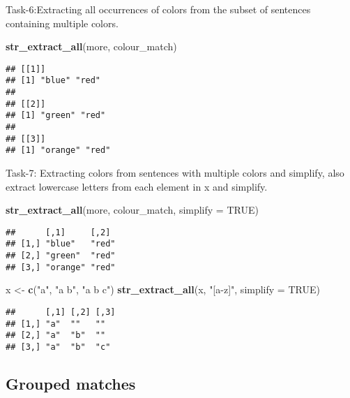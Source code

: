 \documentclass[
]{article}
\newenvironment{Shaded}{\begin{snugshade}}{\end{snugshade}}
\newcommand{\AttributeTok}[1]{\textcolor[rgb]{0.13,0.29,0.53}{#1}}
\newcommand{\ConstantTok}[1]{\textcolor[rgb]{0.56,0.35,0.01}{#1}}
\newcommand{\FunctionTok}[1]{\textcolor[rgb]{0.13,0.29,0.53}{\textbf{#1}}}
\newcommand{\NormalTok}[1]{#1}
\newcommand{\OtherTok}[1]{\textcolor[rgb]{0.56,0.35,0.01}{#1}}
\newcommand{\StringTok}[1]{\textcolor[rgb]{0.31,0.60,0.02}{#1}}
\begin{document}
Task-6:Extracting all occurrences of colors from the subset of sentences
containing multiple colors.

\begin{Shaded}
\begin{Highlighting}[]
\FunctionTok{str\_extract\_all}\NormalTok{(more, colour\_match)}
\end{Highlighting}
\end{Shaded}

\begin{verbatim}
## [[1]]
## [1] "blue" "red" 
## 
## [[2]]
## [1] "green" "red"  
## 
## [[3]]
## [1] "orange" "red"
\end{verbatim}

Task-7: Extracting colors from sentences with multiple colors and
simplify, also extract lowercase letters from each element in x and
simplify.

\begin{Shaded}
\begin{Highlighting}[]
\FunctionTok{str\_extract\_all}\NormalTok{(more, colour\_match, }\AttributeTok{simplify =} \ConstantTok{TRUE}\NormalTok{)}
\end{Highlighting}
\end{Shaded}

\begin{verbatim}
##      [,1]     [,2] 
## [1,] "blue"   "red"
## [2,] "green"  "red"
## [3,] "orange" "red"
\end{verbatim}

\begin{Shaded}
\begin{Highlighting}[]
\NormalTok{x }\OtherTok{\textless{}{-}} \FunctionTok{c}\NormalTok{(}\StringTok{"a"}\NormalTok{, }\StringTok{"a b"}\NormalTok{, }\StringTok{"a b c"}\NormalTok{)}
\FunctionTok{str\_extract\_all}\NormalTok{(x, }\StringTok{"[a{-}z]"}\NormalTok{, }\AttributeTok{simplify =} \ConstantTok{TRUE}\NormalTok{)}
\end{Highlighting}
\end{Shaded}

\begin{verbatim}
##      [,1] [,2] [,3]
## [1,] "a"  ""   ""  
## [2,] "a"  "b"  ""  
## [3,] "a"  "b"  "c"
\end{verbatim}

\hypertarget{grouped-matches}{%
\subsection{Grouped matches}\label{grouped-matches}}
\end{document}
